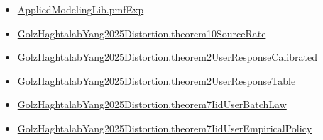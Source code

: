 \documentclass[10pt]{article}
\begin{document}
\begin{itemize}
\item \hyperlink{governing-declaration-8e4b4389a4f6454b}{Applied\allowbreak{}Modeling\allowbreak{}Lib.\allowbreak{}pmf\allowbreak{}Exp}
\item \hyperlink{governing-declaration-aaf6dc2063f9888f}{Golz\allowbreak{}Haghtalab\allowbreak{}Yang2025\allowbreak{}Distortion.\allowbreak{}theorem10\allowbreak{}Source\allowbreak{}Rate}
\item \hyperlink{governing-declaration-080b9388e51a6018}{Golz\allowbreak{}Haghtalab\allowbreak{}Yang2025\allowbreak{}Distortion.\allowbreak{}theorem2\allowbreak{}User\allowbreak{}Response\allowbreak{}Calibrated}
\item \hyperlink{governing-declaration-c5d0273cbd7ddcc9}{Golz\allowbreak{}Haghtalab\allowbreak{}Yang2025\allowbreak{}Distortion.\allowbreak{}theorem2\allowbreak{}User\allowbreak{}Response\allowbreak{}Table}
\item \hyperlink{governing-declaration-485a7e8af83d2b11}{Golz\allowbreak{}Haghtalab\allowbreak{}Yang2025\allowbreak{}Distortion.\allowbreak{}theorem7\allowbreak{}Iid\allowbreak{}User\allowbreak{}Batch\allowbreak{}Law}
\item \hyperlink{governing-declaration-71b9e9aed968af43}{Golz\allowbreak{}Haghtalab\allowbreak{}Yang2025\allowbreak{}Distortion.\allowbreak{}theorem7\allowbreak{}Iid\allowbreak{}User\allowbreak{}Empirical\allowbreak{}Policy}
\end{itemize}
\end{document}
